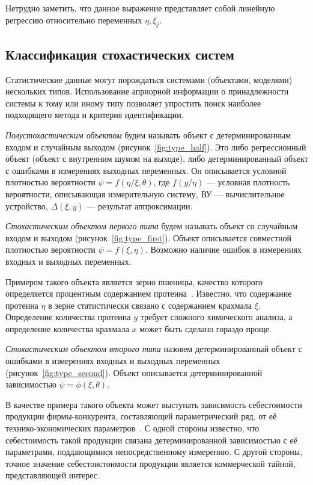 Нетрудно заметить, что данное выражение представляет собой линейную регрессию относительно
переменных \( \eta, \xi_j \).

\subsection{Классификация стохастических систем}

Статистические данные могут порождаться системами (объектами, моделями) нескольких типов.
Использование априорной информации о принадлежности системы к тому или иному типу
позволяет упростить поиск наиболее подходящего метода и критерия идентификации.

\emph{Полустохастическим объектом} будем называть объект с детерминированным входом и
случайным выходом (рисунок~\ref{fig:type_half}).
Это либо регрессионный объект (объект с внутренним шумом на выходе),
либо детерминированный объект с ошибками в измерениях выходных переменных.
Он описывается условной плотностью вероятности \( \psi = f(\eta / \xi, \theta) \),
где \( f(y / \eta) \) --- условная плотность вероятности, описывающая измерительную систему,
ВУ --- вычислительное устройство,
\( \Delta(\xi, y) \) --- результат аппроксимации.

\emph{Стохастическим объектом первого типа} будем называть объект со случайным входом и выходом
(рисунок~\ref{fig:type_first}).
Объект описывается совместной плотностью вероятности \( \psi = f(\xi, \eta) \).
Возможно наличие ошибок в измерениях входных и выходных переменных.

Примером такого объекта является зерно пшеницы,
качество которого определяется процентным содержанием протеина~\cite{ezekiel41}.
Известно, что содержание протеина \( \eta \) в зерне статистически связано с
содержанием крахмала \( \xi \).
Определение количества протеина \( y \) требует сложного химического анализа,
а определение количества крахмала \( x \) может быть сделано гораздо проще.

\emph{Стохастическим объектом второго типа} назовем детерминированный объект с ошибками
в измерениях входных и выходных переменных (рисунок~\ref{fig:type_second}).
Объект описывается детерминированной зависимостью \( \psi = \phi(\xi, \theta) \).

В качестве примера такого объекта может выступать зависимость себестоимости продукции фирмы-конкурента,
составляющей параметрический ряд, от её технико-экономических параметров~\cite{kruchkova02}.
С одной стороны известно,
что себестоимость такой продукции связана детерминированной зависимостью с её параметрами,
поддающимися непосредственному измерению.
С другой стороны, точное значение себестоистоимости продукции является коммерческой тайной,
представляющей интерес.

